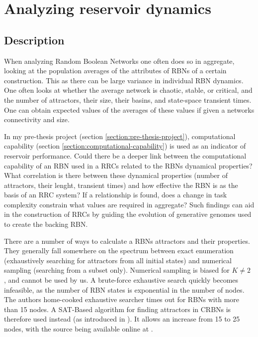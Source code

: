 \section{Analyzing reservoir dynamics}

\subsection{Description}

When analyzing Random Boolean Networks one often does so in aggregate,
looking at the population averages of the attributes of RBNs of a certain construction.
This as there can be large variance in individual RBN dynamics.
One often looks at whether the average network is chaotic, stable, or critical,
and the number of attractors, their size, their basins, and state-space transient times.
One can obtain expected values of the averages of these values if given a networks connectivity and size.

In my pre-thesis project (section \ref{section:pre-thesis-project}),
computational capability (section \ref{section:computational-capability}) is used as an indicator of reservoir performance.
Could there be a deeper link between the computational capability of an RBN used in a RRCs related to the RBNs dynamical properties?
What correlation is there between these dynamical properties (number of attractors, their lenght, transient times)
and how effective the RBN is as the basis of an RRC system?
If a relationship is found, does a change in task complexity constrain what values are required in aggregate?
Such findings can aid in the construction of RRCs by guiding the evolution of generative genomes used to create the backing RBN.

There are a number of ways to calculate a RBNs attractors and their properties.
They generally fall somewhere on the spectrum between exact enumeration (exhaustively searching for attractors from all initial states) and numerical sampling (searching from a subset only).
Numerical sampling is biased for $K\neq2$ \cite{berdahl2009random}, and cannot be used by us.
A brute-force exhaustive search quickly becomes infeasible, as the number of RBN states is exponential in the number of nodes.
The authors home-cooked exhaustive searcher times out for RBNs with more than 15 nodes.
A SAT-Based algorithm for finding attractors in CRBNs is therefore used instead (as introduced in \cite{dubrova2011sat}).
It allows an increase from 15 to 25 nodes, with the source being available online at \cite{dubrova2011sat-online}.

